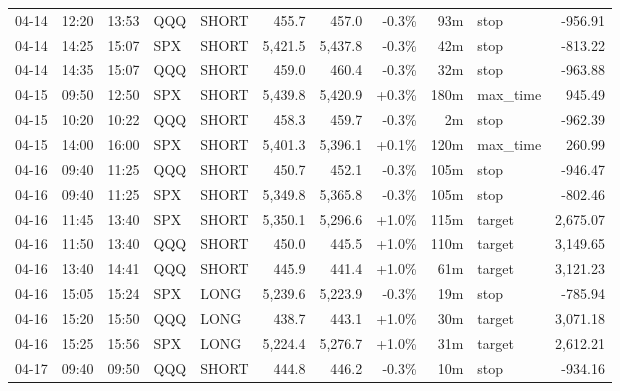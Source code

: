 \documentclass[11pt,a4paper,twoside]{article}
\begin{document}
\begin{center}
\begin{longtable}{>{\color{txtmain}}l l l l l r r r r >{\color{txtmain}}l r}
04-14 & 12:20 & 13:53 & QQQ & SHORT & 455.7 & 457.0 & \textcolor{lossred}{-0.3\%} & 93m & stop & \textcolor{lossred}{-956.91} \\
04-14 & 14:25 & 15:07 & SPX & SHORT & 5,421.5 & 5,437.8 & \textcolor{lossred}{-0.3\%} & 42m & stop & \textcolor{lossred}{-813.22} \\
04-14 & 14:35 & 15:07 & QQQ & SHORT & 459.0 & 460.4 & \textcolor{lossred}{-0.3\%} & 32m & stop & \textcolor{lossred}{-963.88} \\
04-15 & 09:50 & 12:50 & SPX & SHORT & 5,439.8 & 5,420.9 & \textcolor{wingreen}{+0.3\%} & 180m & max\_time & \textcolor{wingreen}{945.49} \\
04-15 & 10:20 & 10:22 & QQQ & SHORT & 458.3 & 459.7 & \textcolor{lossred}{-0.3\%} & 2m & stop & \textcolor{lossred}{-962.39} \\
04-15 & 14:00 & 16:00 & SPX & SHORT & 5,401.3 & 5,396.1 & \textcolor{wingreen}{+0.1\%} & 120m & max\_time & \textcolor{wingreen}{260.99} \\
04-16 & 09:40 & 11:25 & QQQ & SHORT & 450.7 & 452.1 & \textcolor{lossred}{-0.3\%} & 105m & stop & \textcolor{lossred}{-946.47} \\
04-16 & 09:40 & 11:25 & SPX & SHORT & 5,349.8 & 5,365.8 & \textcolor{lossred}{-0.3\%} & 105m & stop & \textcolor{lossred}{-802.46} \\
04-16 & 11:45 & 13:40 & SPX & SHORT & 5,350.1 & 5,296.6 & \textcolor{wingreen}{+1.0\%} & 115m & target & \textcolor{wingreen}{2,675.07} \\
04-16 & 11:50 & 13:40 & QQQ & SHORT & 450.0 & 445.5 & \textcolor{wingreen}{+1.0\%} & 110m & target & \textcolor{wingreen}{3,149.65} \\
04-16 & 13:40 & 14:41 & QQQ & SHORT & 445.9 & 441.4 & \textcolor{wingreen}{+1.0\%} & 61m & target & \textcolor{wingreen}{3,121.23} \\
04-16 & 15:05 & 15:24 & SPX & LONG & 5,239.6 & 5,223.9 & \textcolor{lossred}{-0.3\%} & 19m & stop & \textcolor{lossred}{-785.94} \\
04-16 & 15:20 & 15:50 & QQQ & LONG & 438.7 & 443.1 & \textcolor{wingreen}{+1.0\%} & 30m & target & \textcolor{wingreen}{3,071.18} \\
04-16 & 15:25 & 15:56 & SPX & LONG & 5,224.4 & 5,276.7 & \textcolor{wingreen}{+1.0\%} & 31m & target & \textcolor{wingreen}{2,612.21} \\
04-17 & 09:40 & 09:50 & QQQ & SHORT & 444.8 & 446.2 & \textcolor{lossred}{-0.3\%} & 10m & stop & \textcolor{lossred}{-934.16} \\

\end{longtable}
\end{center}
\end{document}
